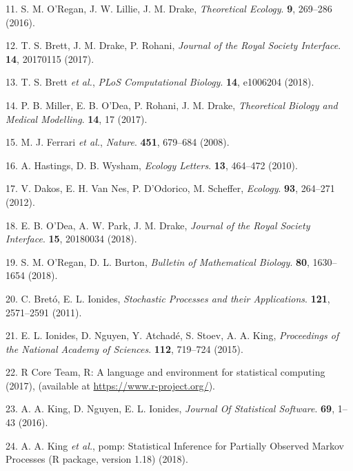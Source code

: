 \documentclass[3p]{elsarticle} %
\begin{document}
\leavevmode\hypertarget{ref-ORegan2016}{}%
11. S. M. O'Regan, J. W. Lillie, J. M. Drake, \emph{Theoretical
Ecology}. \textbf{9}, 269--286 (2016).

\leavevmode\hypertarget{ref-Brett2017}{}%
12. T. S. Brett, J. M. Drake, P. Rohani, \emph{Journal of the Royal
Society Interface}. \textbf{14}, 20170115 (2017).

\leavevmode\hypertarget{ref-Brett2018}{}%
13. T. S. Brett \emph{et al.}, \emph{PLoS Computational Biology}.
\textbf{14}, e1006204 (2018).

\leavevmode\hypertarget{ref-Miller2017}{}%
14. P. B. Miller, E. B. O'Dea, P. Rohani, J. M. Drake, \emph{Theoretical
Biology and Medical Modelling}. \textbf{14}, 17 (2017).

\leavevmode\hypertarget{ref-Ferrari2008}{}%
15. M. J. Ferrari \emph{et al.}, \emph{Nature}. \textbf{451}, 679--684
(2008).

\leavevmode\hypertarget{ref-Hastings2010}{}%
16. A. Hastings, D. B. Wysham, \emph{Ecology Letters}. \textbf{13},
464--472 (2010).

\leavevmode\hypertarget{ref-Dakos2012a}{}%
17. V. Dakos, E. H. Van Nes, P. D'Odorico, M. Scheffer, \emph{Ecology}.
\textbf{93}, 264--271 (2012).

\leavevmode\hypertarget{ref-ODea2018a}{}%
18. E. B. O'Dea, A. W. Park, J. M. Drake, \emph{Journal of the Royal
Society Interface}. \textbf{15}, 20180034 (2018).

\leavevmode\hypertarget{ref-ORegan2018}{}%
19. S. M. O'Regan, D. L. Burton, \emph{Bulletin of Mathematical
Biology}. \textbf{80}, 1630--1654 (2018).

\leavevmode\hypertarget{ref-Breto2011}{}%
20. C. Bretó, E. L. Ionides, \emph{Stochastic Processes and their
Applications}. \textbf{121}, 2571--2591 (2011).

\leavevmode\hypertarget{ref-Ionides2015}{}%
21. E. L. Ionides, D. Nguyen, Y. Atchadé, S. Stoev, A. A. King,
\emph{Proceedings of the National Academy of Sciences}. \textbf{112},
719--724 (2015).

\leavevmode\hypertarget{ref-R2017}{}%
22. R Core Team, R: A language and environment for statistical computing
(2017), (available at \url{https://www.r-project.org/}).

\leavevmode\hypertarget{ref-King2016}{}%
23. A. A. King, D. Nguyen, E. L. Ionides, \emph{Journal Of Statistical
Software}. \textbf{69}, 1--43 (2016).

\leavevmode\hypertarget{ref-King2018}{}%
24. A. A. King \emph{et al.}, pomp: Statistical Inference for Partially
Observed Markov Processes (R package, version 1.18) (2018).
\end{document}
